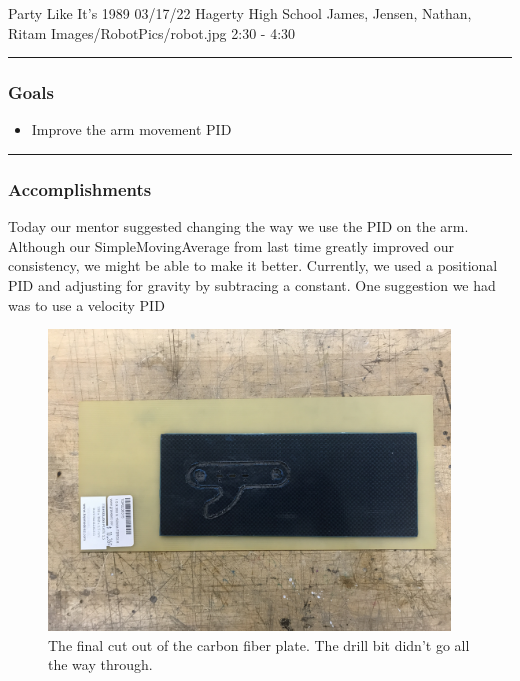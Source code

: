 \insertmeeting 
	{Party Like It's 1989} 
	{03/17/22} 
	{Hagerty High School}
	{James, Jensen, Nathan, Ritam}
	{Images/RobotPics/robot.jpg}
	{2:30 - 4:30}
	
\noindent\hfil\rule{\textwidth}{.4pt}\hfil
\subsubsection*{Goals}
\begin{itemize}
    \item Improve the arm movement PID 

\end{itemize} 

\noindent\hfil\rule{\textwidth}{.4pt}\hfil

\subsubsection*{Accomplishments}
Today our mentor suggested changing the way we use the PID on the arm. Although our SimpleMovingAverage from last time greatly improved our consistency, we might be able to make it better. Currently, we used a positional PID and adjusting for gravity by subtracing a constant. One suggestion we had was to use a velocity PID 


\begin{figure}[htp]
\centering
\includegraphics[width=0.95\textwidth, angle=0]{Meetings/March/03-14-22/03-14-22 1.JPG}
\caption{The final cut out of the carbon fiber plate. The drill bit didn't go all the way through.}
\label{fig:031022_1}
\end{figure}

